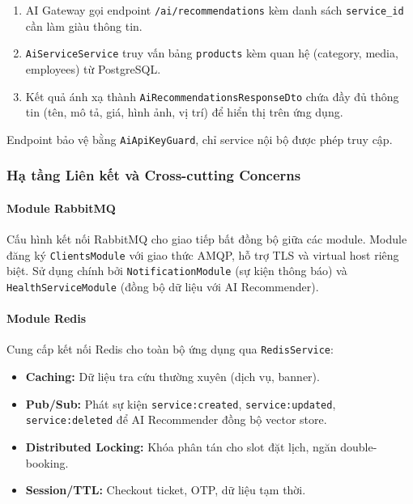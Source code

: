 \begin{enumerate}
    \item AI Gateway gọi endpoint \texttt{/ai/recommendations} kèm danh sách \texttt{service\_id} cần làm giàu thông tin.
    \item \texttt{AiServiceService} truy vấn bảng \texttt{products} kèm quan hệ (category, media, employees) từ PostgreSQL.
    \item Kết quả ánh xạ thành \texttt{AiRecommendationsResponseDto} chứa đầy đủ thông tin (tên, mô tả, giá, hình ảnh, vị trí) để hiển thị trên ứng dụng.
\end{enumerate}

Endpoint bảo vệ bằng \texttt{AiApiKeyGuard}, chỉ service nội bộ được phép truy cập.

\subsubsection{Hạ tầng Liên kết và Cross-cutting Concerns}

\paragraph{Module RabbitMQ}

Cấu hình kết nối RabbitMQ cho giao tiếp bất đồng bộ giữa các module. Module đăng ký \texttt{ClientsModule} với giao thức AMQP, hỗ trợ TLS và virtual host riêng biệt. Sử dụng chính bởi \texttt{NotificationModule} (sự kiện thông báo) và \texttt{HealthServiceModule} (đồng bộ dữ liệu với AI Recommender).

\paragraph{Module Redis}

Cung cấp kết nối Redis cho toàn bộ ứng dụng qua \texttt{RedisService}:

\begin{itemize}
    \item \textbf{Caching:} Dữ liệu tra cứu thường xuyên (dịch vụ, banner).
    \item \textbf{Pub/Sub:} Phát sự kiện \texttt{service:created}, \texttt{service:updated}, \texttt{service:deleted} để AI Recommender đồng bộ vector store.
    \item \textbf{Distributed Locking:} Khóa phân tán cho slot đặt lịch, ngăn double-booking.
    \item \textbf{Session/TTL:} Checkout ticket, OTP, dữ liệu tạm thời.
\end{itemize}

